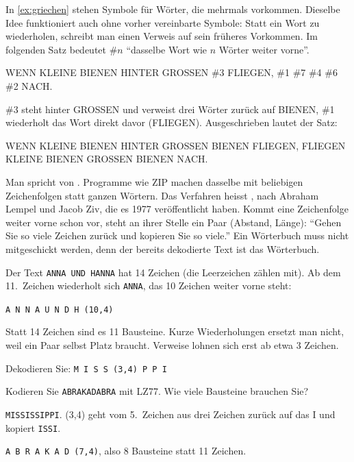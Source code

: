 In \cref{ex:griechen} stehen Symbole für Wörter, die mehrmals vorkommen. Dieselbe Idee funktioniert auch ohne vorher vereinbarte Symbole: Statt ein Wort zu wiederholen, schreibt man einen Verweis auf sein früheres Vorkommen. Im folgenden Satz bedeutet \#$n$ \enquote{dasselbe Wort wie $n$ Wörter weiter vorne}.
\begin{center}
	WENN KLEINE BIENEN HINTER GROSSEN \#3 FLIEGEN, \#1 \#7 \#4 \#6 \#2 NACH.
\end{center}
\#3 steht hinter GROSSEN und verweist drei Wörter zurück auf BIENEN, \#1 wiederholt das Wort direkt davor (FLIEGEN). Ausgeschrieben lautet der Satz:
\begin{center}
	WENN KLEINE BIENEN HINTER GROSSEN BIENEN FLIEGEN, FLIEGEN KLEINE BIENEN GROSSEN BIENEN NACH.
\end{center}
Man spricht von . Programme wie ZIP machen dasselbe mit beliebigen Zeichenfolgen statt ganzen Wörtern. Das Verfahren heisst , nach Abraham Lempel und Jacob Ziv, die es 1977 veröffentlicht haben. Kommt eine Zeichenfolge weiter vorne schon vor, steht an ihrer Stelle ein Paar (Abstand, Länge): \enquote{Gehen Sie so viele Zeichen zurück und kopieren Sie so viele.} Ein Wörterbuch muss nicht mitgeschickt werden, denn der bereits dekodierte Text ist das Wörterbuch.

\begin{myexample}\label{ex:lz77-anna}
	Der Text \texttt{ANNA UND HANNA} hat 14 Zeichen (die Leerzeichen zählen mit). Ab dem 11.~Zeichen wiederholt sich \texttt{ANNA}, das 10 Zeichen weiter vorne steht:
	\begin{center}
		\texttt{A N N A \textvisiblespace{} U N D \textvisiblespace{} H (10,4)}
	\end{center}
	Statt 14 Zeichen sind es 11 Bausteine. Kurze Wiederholungen ersetzt man nicht, weil ein Paar selbst Platz braucht. Verweise lohnen sich erst ab etwa 3 Zeichen.
\end{myexample}

\begin{myexercise}\label{ex:lz77}
	\begin{aenum}
		\item Dekodieren Sie: \texttt{M I S S (3,4) P P I}
		\item Kodieren Sie \texttt{ABRAKADABRA} mit LZ77. Wie viele Bausteine brauchen Sie?
	\end{aenum}
	\begin{myanswer}
		\begin{aenum}
			\item \texttt{MISSISSIPPI}. (3,4) geht vom 5.~Zeichen aus drei Zeichen zurück auf das I und kopiert \texttt{ISSI}.
			\item \texttt{A B R A K A D (7,4)}, also 8 Bausteine statt 11 Zeichen.
		\end{aenum}
	\end{myanswer}
\end{myexercise}

